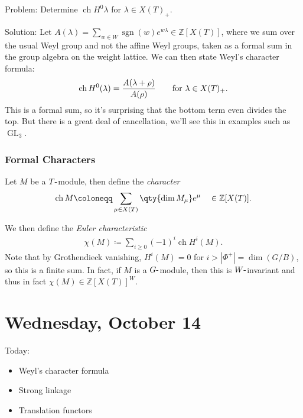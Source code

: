 Problem: Determine \(\operatorname{ch}H^0 \lambda\) for
\(\lambda \in X(T)_+\).

Solution: Let
\(A(\lambda) = \sum_{w\in W} \operatorname{sgn}(w) e^{w\lambda} \in {\mathbb{Z}}[X(T)]\),
where we sum over the usual Weyl group and not the affine Weyl groups,
taken as a formal sum in the group algebra on the weight lattice. We can
then state Weyl's character formula:
\begin{align*}  
\operatorname{ch}H^0(\lambda) = {A(\lambda + \rho) \over A(\rho)} \qquad \text{for }\lambda \in X(T)_+
.\end{align*}
This is a formal sum, so it's surprising that the bottom term even
divides the top. But there is a great deal of cancellation, we'll see
this in examples such as \(\operatorname{GL}_3\).

\hypertarget{formal-characters}{%
\subsubsection{Formal Characters}\label{formal-characters}}

Let \(M\) be a \(T{\hbox{-}}\)module, then define the \emph{character}
\begin{align*}  
\operatorname{ch}M\coloneqq\sum_{\mu\in X(T)} \qty{\dim M_\mu} e^\mu \quad \in {\mathbb{Z}}[X(T)]
.\end{align*}

We then define the \emph{Euler characteristic}
\begin{align*}  
\chi(M) \coloneqq\sum_{i\geq 0} (-1)^i \operatorname{ch}H^i(M)
.\end{align*}
Note that by Grothendieck vanishing, \(H^i(M) = 0\) for
\(i > {\left\lvert {\Phi^+} \right\rvert} = \dim(G/B)\), so this is a
finite sum. In fact, if \(M\) is a \(G{\hbox{-}}\)module, then this is
\(W{\hbox{-}}\)invariant and thus in fact
\(\chi(M) \in {\mathbb{Z}}[X(T)]^W\).

\hypertarget{wednesday-october-14}{%
\section{Wednesday, October 14}\label{wednesday-october-14}}

Today:

\begin{itemize}
\item
  Weyl's character formula
\item
  Strong linkage
\item
  Translation functors
\end{itemize}

